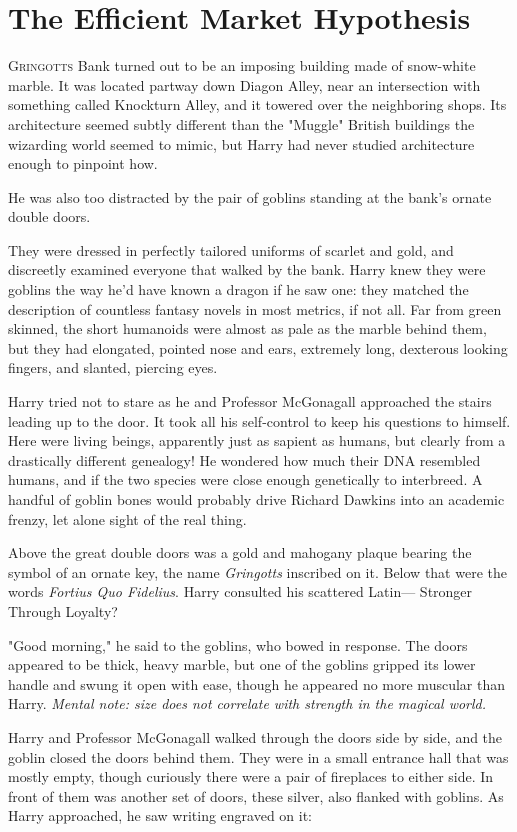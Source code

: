 \chapter{The Efficient Market Hypothesis}

\lettrine{G}{ringotts} Bank turned out to be an imposing
building made of snow-white marble. It was located
partway down Diagon Alley, near an intersection with
something called Knockturn Alley, and it towered over the
neighboring shops. Its architecture seemed subtly different
than the "Muggle" British buildings the wizarding world
seemed to mimic, but Harry had never studied architecture
enough to pinpoint how.

He was also too distracted by the pair of goblins standing
at the bank's ornate double doors.

They were dressed in perfectly tailored uniforms of scarlet
and gold, and discreetly examined everyone that walked by
the bank. Harry knew they were goblins the way he'd
have known a dragon if he saw one: they matched the
description of countless fantasy novels in most metrics, if
not all. Far from green skinned, the short humanoids were
almost as pale as the marble behind them, but they had
elongated, pointed nose and ears, extremely long, dexterous
looking fingers, and slanted, piercing eyes.

Harry tried not to stare as he and Professor McGonagall
approached the stairs leading up to the door. It took all
his self-control to keep his questions to himself.
Here were living beings, apparently just as sapient as
humans, but clearly from a drastically different genealogy!
He wondered how much their DNA resembled humans,
and if the two species were close enough genetically to
interbreed. A handful of goblin bones would probably drive
Richard Dawkins into an academic frenzy, let alone sight of
the real thing.

Above the great double doors was a gold and mahogany
plaque bearing the symbol of an ornate key, the name
\emph{Gringotts} inscribed on it. Below that were the words
\emph{Fortius Quo Fidelius}. Harry consulted his scattered Latin—
Stronger Through Loyalty?

"Good morning," he said to the goblins, who bowed in
response. The doors appeared to be thick, heavy marble,
but one of the goblins gripped its lower handle and swung
it open with ease, though he appeared no more muscular
than Harry. \emph{Mental note: size does not correlate with
strength in the magical world.}

Harry and Professor McGonagall walked through the doors
side by side, and the goblin closed the doors behind them. They
were in a small entrance hall that was mostly empty,
though curiously there were a pair of fireplaces to either
side. In front of them was another set of doors, these
silver, also flanked with goblins. As Harry approached, he
saw writing engraved on it:

